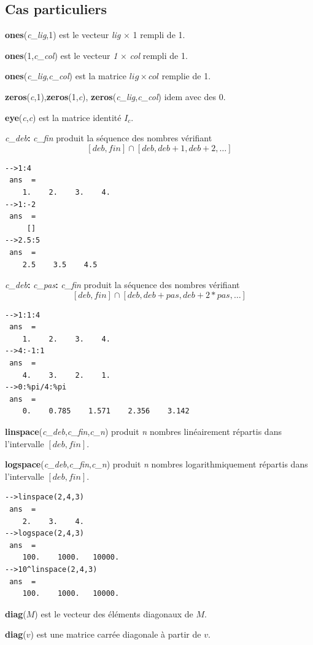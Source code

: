 \documentclass{article}
\begin{document}
\begin{multicols}{3}
\subsection*{Cas particuliers}
\begin{description}
\item{\textbf{ones}(\textit{c\_lig},1)} est le vecteur \textit{lig} $\times$ 1 rempli de 1.
\item{\textbf{ones}(1,\textit{c\_col})} est le vecteur \textit{1} $\times$  \textit{col} rempli de 1.
\item{\textbf{ones}(\textit{c\_lig},\textit{c\_col})} est la matrice $lig \times col$ remplie de 1.
\item{\textbf{zeros}(\textit{c},1),\textbf{zeros}(1,\textit{c}), \textbf{zeros}(\textit{c\_lig},\textit{c\_col})}  idem avec des 0.
\item{\textbf{eye}(\textit{c},\textit{c})} est la matrice identité $I_{c}$.
\item{\textit{c\_deb}\textbf{:} \textit{c\_fin}} produit la séquence des nombres vérifiant
$$ [deb,fin] \cap [deb,deb+1,deb+2,\ldots]$$
\begin{verbatim}
-->1:4
 ans  =
    1.    2.    3.    4.  
-->1:-2
 ans  =
     []
-->2.5:5
 ans  =
    2.5    3.5    4.5 
\end{verbatim}
\item{\textit{c\_deb}\textbf{:} \textit{c\_pas}\textbf{:} \textit{c\_fin}} produit la séquence des nombres vérifiant
$$ [deb,fin] \cap [deb,deb+pas,deb+2*pas,\ldots]$$
\begin{verbatim}
-->1:1:4
 ans  =
    1.    2.    3.    4.  
-->4:-1:1
 ans  =
    4.    3.    2.    1.  
-->0:%pi/4:%pi
 ans  =
    0.    0.785    1.571    2.356    3.142
\end{verbatim}
\item{\textbf{linspace}(\textit{c\_deb},\textit{c\_fin},\textit{c\_n})} produit \textit{n} nombres linéairement répartis dans l'intervalle $[deb,fin]$.
\item{\textbf{logspace}(\textit{c\_deb},\textit{c\_fin},\textit{c\_n})}  produit \textit{n} nombres logarithmiquement répartis dans l'intervalle $[deb,fin]$.
\begin{verbatim}
-->linspace(2,4,3)
 ans  =
    2.    3.    4.  
-->logspace(2,4,3)
 ans  =
    100.    1000.   10000.
-->10^linspace(2,4,3)
 ans  =
    100.    1000.   10000. 
\end{verbatim}
\item{\textbf{diag}($M$)} est le vecteur des éléments diagonaux de $M$.
\item{\textbf{diag}($v$)} est une matrice carrée diagonale à partir de $v$.

\end{description}
\end{multicols}
\end{document}
